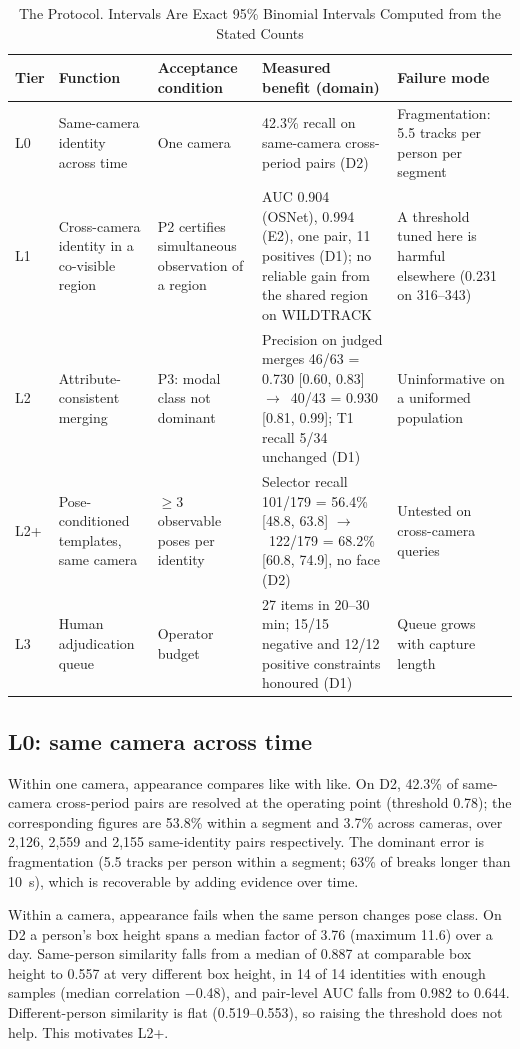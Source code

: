 \documentclass[journal]{IEEEtran}
\newcommand{\ra}{$\rightarrow$}
\begin{document}
\begin{table}[t]
\caption{The Protocol. Intervals Are Exact 95\% Binomial Intervals Computed from the Stated Counts}\label{tab:protocol}
\centering
\begin{tabular}{@{}p{0.6cm}p{2.9cm}p{2.6cm}p{6.3cm}p{4.0cm}@{}}
\toprule
Tier & Function & Acceptance condition & Measured benefit (domain) & Failure mode\\
\midrule
L0 & Same-camera identity across time & One camera & 42.3\% recall on same-camera cross-period pairs (D2) & Fragmentation: 5.5 tracks per person per segment\\
L1 & Cross-camera identity in a co-visible region & P2 certifies simultaneous observation of a region & AUC 0.904 (OSNet), 0.994 (E2), one pair, 11 positives (D1); no reliable gain from the shared region on WILDTRACK & A threshold tuned here is harmful elsewhere (0.231 on 316--343)\\
L2 & Attribute-consistent merging & P3: modal class not dominant & Precision on judged merges 46/63 = 0.730 [0.60, 0.83] \ra\ 40/43 = 0.930 [0.81, 0.99]; T1 recall 5/34 unchanged (D1) & Uninformative on a uniformed population\\
L2+ & Pose-conditioned templates, same camera & $\ge 3$ observable poses per identity & Selector recall 101/179 = 56.4\% [48.8, 63.8] \ra\ 122/179 = 68.2\% [60.8, 74.9], no face (D2) & Untested on cross-camera queries\\
L3 & Human adjudication queue & Operator budget & 27 items in 20--30 min; 15/15 negative and 12/12 positive constraints honoured (D1) & Queue grows with capture length\\
\bottomrule
\end{tabular}
\end{table}

\subsection{L0: same camera across time}
Within one camera, appearance compares like with like. On D2, 42.3\% of same-camera cross-period pairs are resolved at the operating point (threshold 0.78); the corresponding figures are 53.8\% within a segment and 3.7\% across cameras, over 2,126, 2,559 and 2,155 same-identity pairs respectively. The dominant error is fragmentation (5.5 tracks per person within a segment; 63\% of breaks longer than 10~s), which is recoverable by adding evidence over time.

Within a camera, appearance fails when the same person changes pose class. On D2 a person's box height spans a median factor of 3.76 (maximum 11.6) over a day. Same-person similarity falls from a median of 0.887 at comparable box height to 0.557 at very different box height, in 14 of 14 identities with enough samples (median correlation $-$0.48), and pair-level AUC falls from 0.982 to 0.644. Different-person similarity is flat (0.519--0.553), so raising the threshold does not help. This motivates L2+.
\end{document}
